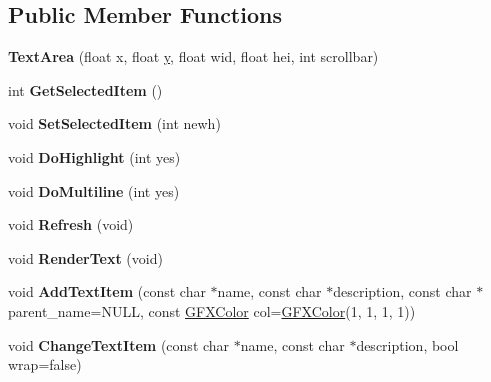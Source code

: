 \subsection*{Public Member Functions}
\begin{DoxyCompactItemize}
\item 
{\bfseries Text\+Area} (float x, float \hyperlink{IceUtils_8h_aa7ffaed69623192258fb8679569ff9ba}{y}, float wid, float hei, int scrollbar)\hypertarget{classTextArea_ad77e95733d0f5357dadcddf22fa74ed4}{}\label{classTextArea_ad77e95733d0f5357dadcddf22fa74ed4}

\item 
int {\bfseries Get\+Selected\+Item} ()\hypertarget{classTextArea_ae8074e9db88ddf9a2664d6d373e1ccf9}{}\label{classTextArea_ae8074e9db88ddf9a2664d6d373e1ccf9}

\item 
void {\bfseries Set\+Selected\+Item} (int newh)\hypertarget{classTextArea_a97c108fab800878d40d19cbd45f47ebe}{}\label{classTextArea_a97c108fab800878d40d19cbd45f47ebe}

\item 
void {\bfseries Do\+Highlight} (int yes)\hypertarget{classTextArea_a7fe2536aa65b3cc92fa301170cae66e0}{}\label{classTextArea_a7fe2536aa65b3cc92fa301170cae66e0}

\item 
void {\bfseries Do\+Multiline} (int yes)\hypertarget{classTextArea_a134f227d220bcbebb5f320b26fd7b43d}{}\label{classTextArea_a134f227d220bcbebb5f320b26fd7b43d}

\item 
void {\bfseries Refresh} (void)\hypertarget{classTextArea_a940e81075bf182666c313540b9f48f6e}{}\label{classTextArea_a940e81075bf182666c313540b9f48f6e}

\item 
void {\bfseries Render\+Text} (void)\hypertarget{classTextArea_a9f4ac0c4ef95b0f60f36c10efccf0836}{}\label{classTextArea_a9f4ac0c4ef95b0f60f36c10efccf0836}

\item 
void {\bfseries Add\+Text\+Item} (const char $\ast$name, const char $\ast$description, const char $\ast$parent\+\_\+name=N\+U\+LL, const \hyperlink{structGFXColor}{G\+F\+X\+Color} col=\hyperlink{structGFXColor}{G\+F\+X\+Color}(1, 1, 1, 1))\hypertarget{classTextArea_ad3b7953061d8efb51461641a6b7dfebd}{}\label{classTextArea_ad3b7953061d8efb51461641a6b7dfebd}

\item 
void {\bfseries Change\+Text\+Item} (const char $\ast$name, const char $\ast$description, bool wrap=false)\hypertarget{classTextArea_a10d124f61c7d944452b92f8d69d63ed5}{}\label{classTextArea_a10d124f61c7d944452b92f8d69d63ed5}


\end{DoxyCompactItemize}
